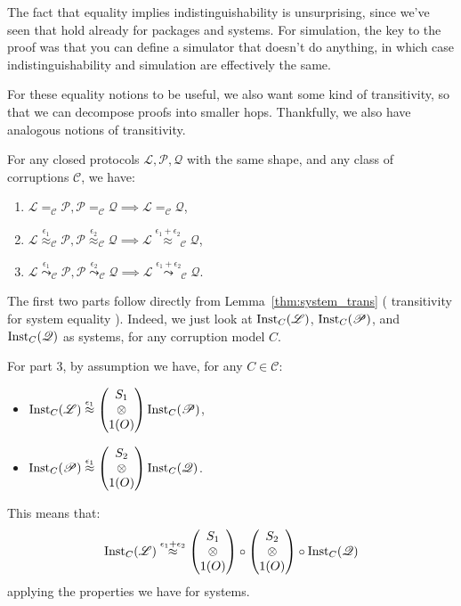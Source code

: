The fact that equality implies indistinguishability is unsurprising,
since we've seen that hold already for packages and systems.
For simulation, the key to the proof was that you can
define a simulator that doesn't do anything, in which
case indistinguishability and simulation are effectively the same.

For these equality notions to be useful, we also want some kind of transitivity,
so that we can decompose proofs into smaller hops.
Thankfully, we also have analogous notions of transitivity.

\begin{theorem}
  \label{thm:prot_trans}
  For any closed protocols $\mathscr{L}, \mathscr{P}, \mathscr{Q}$ with the same shape,
  and any class of corruptions $\mathscr{C}$, we have:
  \begin{enumerate}
    \item $\mathscr{L} =_{\mathscr{C}} \mathscr{P}, \mathscr{P} =_{\mathscr{C}} \mathscr{Q} \implies \mathscr{L} =_{\mathscr{C}}\mathscr{Q}$,
    \item $\mathscr{L} \overset{\epsilon_1}{\approx}_{\mathscr{C}} \mathscr{P}, \mathscr{P} \overset{\epsilon_2}{\approx}_{\mathscr{C}} \mathscr{Q} \implies \mathscr{L} \overset{\epsilon_1 + \epsilon_2}{\approx}_{\mathscr{C}} \mathscr{Q}$,
    \item $\mathscr{L} \overset{\epsilon_1}{\leadsto}_{\mathscr{C}} \mathscr{P}, \mathscr{P} \overset{\epsilon_2}{\leadsto}_{\mathscr{C}} \mathscr{Q} \implies \mathscr{L} \overset{\epsilon_1 + \epsilon_2}{\leadsto}_{\mathscr{C}} \mathscr{Q}$.
  \end{enumerate}

   The first two parts follow directly from Lemma~\ref{thm:system_trans} (
    transitivity for system equality
  ).
  Indeed, we just look at $\text{Inst}_C(\mathscr{L})$, $\text{Inst}_C(\mathscr{P})$, and $\text{Inst}_C(\mathscr{Q})$
  as systems, for any corruption model $C$.

  For part 3, by assumption we have, for any $C \in \mathscr{C}$:
  \begin{itemize}
  \item $\text{Inst}_C(\mathscr{L}) \overset{\epsilon_1}{\approx} \begin{pmatrix} S_1\cr \otimes\cr 1(O)\end{pmatrix} \text{Inst}_C(\mathscr{P})$,
  \item $\text{Inst}_C(\mathscr{P}) \overset{\epsilon_1}{\approx} \begin{pmatrix} S_2\cr \otimes\cr 1(O)\end{pmatrix} \text{Inst}_C(\mathscr{Q})$.
  \end{itemize}
  This means that:
  $$
  \text{Inst}_C(\mathscr{L}) \overset{\epsilon_1 + \epsilon_2}{\approx}
  \begin{pmatrix}
    S_1 \cr
    \otimes\cr
    1(O)
  \end{pmatrix}
  \circ
  \begin{pmatrix}
    S_2 \cr
    \otimes\cr
    1(O)
  \end{pmatrix}
  \circ
  \text{Inst}_C(\mathscr{Q})
  $$
  applying the properties we have for systems.


\end{theorem}

